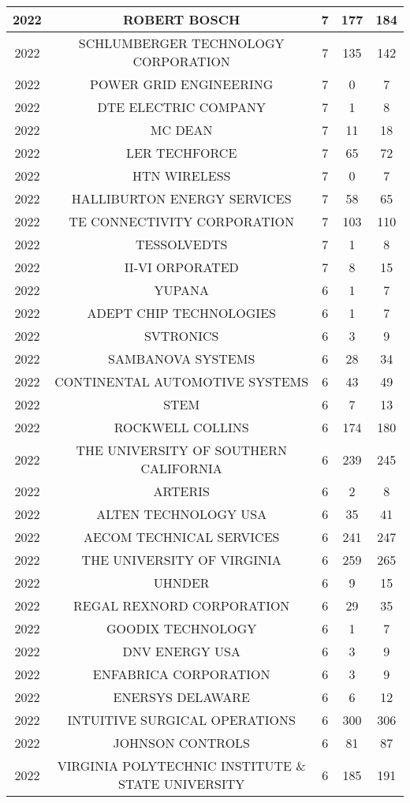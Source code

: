 \documentclass{article}%
\begin{document}
\begin{longtable}{c|c|c|c|c}
\hline%
2022&ROBERT BOSCH&7&177&184\\%
\hline%
2022&SCHLUMBERGER TECHNOLOGY CORPORATION&7&135&142\\%
\hline%
2022&POWER GRID ENGINEERING&7&0&7\\%
\hline%
2022&DTE ELECTRIC COMPANY&7&1&8\\%
\hline%
2022&MC DEAN&7&11&18\\%
\hline%
2022&LER TECHFORCE&7&65&72\\%
\hline%
2022&HTN WIRELESS&7&0&7\\%
\hline%
2022&HALLIBURTON ENERGY SERVICES&7&58&65\\%
\hline%
2022&TE CONNECTIVITY CORPORATION&7&103&110\\%
\hline%
2022&TESSOLVEDTS&7&1&8\\%
\hline%
2022&II{-}VI ORPORATED&7&8&15\\%
\hline%
2022&YUPANA&6&1&7\\%
\hline%
2022&ADEPT CHIP TECHNOLOGIES&6&1&7\\%
\hline%
2022&SVTRONICS&6&3&9\\%
\hline%
2022&SAMBANOVA SYSTEMS&6&28&34\\%
\hline%
2022&CONTINENTAL AUTOMOTIVE SYSTEMS&6&43&49\\%
\hline%
2022&STEM&6&7&13\\%
\hline%
2022&ROCKWELL COLLINS&6&174&180\\%
\hline%
2022&THE UNIVERSITY OF SOUTHERN CALIFORNIA&6&239&245\\%
\hline%
2022&ARTERIS&6&2&8\\%
\hline%
2022&ALTEN TECHNOLOGY USA&6&35&41\\%
\hline%
2022&AECOM TECHNICAL SERVICES&6&241&247\\%
\hline%
2022&THE UNIVERSITY OF VIRGINIA&6&259&265\\%
\hline%
2022&UHNDER&6&9&15\\%
\hline%
2022&REGAL REXNORD CORPORATION&6&29&35\\%
\hline%
2022&GOODIX TECHNOLOGY&6&1&7\\%
\hline%
2022&DNV ENERGY USA&6&3&9\\%
\hline%
2022&ENFABRICA CORPORATION&6&3&9\\%
\hline%
2022&ENERSYS DELAWARE&6&6&12\\%
\hline%
2022&INTUITIVE SURGICAL OPERATIONS&6&300&306\\%
\hline%
2022&JOHNSON CONTROLS&6&81&87\\%
\hline%
2022&VIRGINIA POLYTECHNIC INSTITUTE \& STATE UNIVERSITY&6&185&191\\%

\end{longtable}
\end{document}
